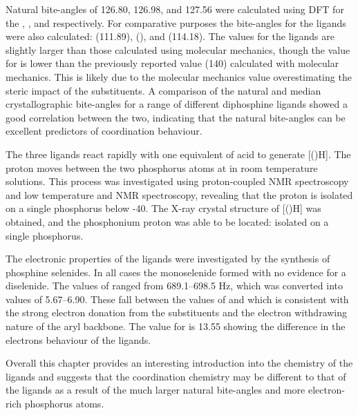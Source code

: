 Natural bite-angles of 126.80, 126.98, and 127.56\degrees{} were calculated using DFT for the \tBusixantphos{}, \tButhixantphos, and \tBuxantphos{} respectively.  For comparative purposes the bite-angles for the \Phxantphos{} ligands were also calculated: \Phsixantphos{} (111.89\degrees), \Phthixantphos{} (\fixme{112.65\degrees}), and \Phxantphos{} (114.18\degrees).  The values for the \Phxantphos{} ligands are slightly larger than those calculated using molecular mechanics, though the value for \tBuxantphos{} is lower than the previously reported value (140\degrees) calculated with molecular mechanics.  This is likely due to the molecular mechanics value overestimating the steric impact of the \tBu{} substituents.  A comparison of the natural and median crystallographic bite-angles for a range of different diphosphine ligands showed a good correlation between the two, indicating that the natural bite-angles can be excellent predictors of coordination behaviour.  

The three \tBuxantphos{} ligands react rapidly with one equivalent of acid to generate [(\tBuxantphos)H].  The proton moves between the two phosphorus atoms at in room temperature solutions.  This process was investigated using proton-coupled \phosphorus{} NMR spectroscopy and low temperature \proton{} and \phosphorus{} NMR spectroscopy, revealing that the proton is isolated on a single phosphorus below -40\degC.  The X-ray crystal structure of [(\tButhixantphos)H] was obtained, and the phosphonium proton was able to be located: isolated on a single phosphorus.  

The electronic properties of the \tBuxantphos{} ligands were investigated by the synthesis of phosphine selenides.  In all cases the monoselenide formed with no evidence for a diselenide.  The values of \JPSe{} ranged from 689.1--698.5 Hz, which was converted into \pKb{} values of 5.67--6.90.  These fall between the values of  and  which is consistent with the strong electron donation from the \tBu{} substituents and the electron withdrawing nature of the aryl backbone.  The \pKb{} value for \Phxantphos{} is 13.55 showing the difference in the electrons behaviour of the \tBuxantphos{} ligands.

Overall this chapter provides an interesting introduction into the chemistry of the \tBuxantphos{} ligands and suggests that the coordination chemistry may be different to that of the \Phxantphos{} ligands as a result of the much larger natural bite-angles and more electron-rich phosphorus atoms.  














